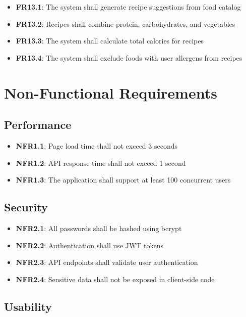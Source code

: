 \begin{itemize}
    \item \textbf{FR13.1}: The system shall generate recipe suggestions from food catalog
    \item \textbf{FR13.2}: Recipes shall combine protein, carbohydrates, and vegetables
    \item \textbf{FR13.3}: The system shall calculate total calories for recipes
    \item \textbf{FR13.4}: The system shall exclude foods with user allergens from recipes
\end{itemize}

\section{Non-Functional Requirements}

\subsection{Performance}

\begin{itemize}
    \item \textbf{NFR1.1}: Page load time shall not exceed 3 seconds
    \item \textbf{NFR1.2}: API response time shall not exceed 1 second
    \item \textbf{NFR1.3}: The application shall support at least 100 concurrent users
\end{itemize}

\subsection{Security}

\begin{itemize}
    \item \textbf{NFR2.1}: All passwords shall be hashed using bcrypt
    \item \textbf{NFR2.2}: Authentication shall use JWT tokens
    \item \textbf{NFR2.3}: API endpoints shall validate user authentication
    \item \textbf{NFR2.4}: Sensitive data shall not be exposed in client-side code
\end{itemize}

\subsection{Usability}


